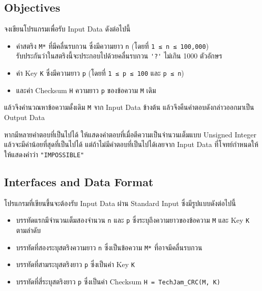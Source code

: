 \subsection{Objectives}

\noindent
จงเขียนโปรแกรมเพื่อรับ Input Data ดังต่อไปนี้
\begin{itemize}
    \item
        ค่าสตริง \lstinline{M*} ที่มีคลื่นรบกวน ซึ่งมีความยาว \lstinline{n} (โดยที่ \lstinline{1 ≤ n ≤ 100,000}) \\
        รับประกันว่าในสตริงนี้จะประกอบไปด้วยคลื่นรบกวน \lstinline{'?'} ไม่เกิน 1000 ตัวอักษร
    \item 
        ค่า Key \lstinline{K} ซึ่งมีความยาว \lstinline{p} (โดยที่ \lstinline{1 ≤ p ≤ 100} และ \lstinline{p ≤ n})
    \item 
        และค่า Checksum \lstinline{H} ความยาว \lstinline{p} ของข้อความ \lstinline{M} เดิม 
\end{itemize}

\noindent
แล้วจึงคำนวณหาข้อความดั้งเดิม \lstinline{M} จาก Input Data ข้างต้น แล้วจึงคืนคำตอบดังกล่าวออกมาเป็น Output Data

หากมีหลายคำตอบที่เป็นไปได้ ให้แสดงคำตอบที่เมื่อตีความเป็นจำนวนเต็มแบบ Unsigned Integer แล้วจะมีค่าน้อยที่สุดที่เป็นไปได้ \;
แต่ถ้าไม่มีคำตอบที่เป็นไปได้เลยจาก Input Data ที่โจทย์กำหนดให้ ให้แสดงคำว่า \lstinline{"IMPOSSIBLE"}


\subsection{Interfaces and Data Format}

\noindent
โปรแกรมที่เขียนขึ้นจะต้องรับ Input Data ผ่าน Standard Input ซึ่งมีรูปแบบดังต่อไปนี้

\begin{itemize}
    \item
        บรรทัดแรกมีจำนวนเต็มสองจำนวน \lstinline{n} และ \lstinline{p} ซึ่งระบุถึงความยาวของข้อความ \lstinline{M} และ Key \lstinline{K} ตามลำดับ
    \item 
        บรรทัดที่สองระบุสตริงความยาว \lstinline{n} ซึ่งเป็นข้อความ \lstinline{M*} ที่อาจมีคลื่นรบกวน
    \item 
        บรรทัดที่สามระบุสตริงยาว \lstinline{p} ซึ่งเป็นค่า Key \lstinline{K}
    \item
        บรรทัดที่สี่ระบุสตริงยาว \lstinline{p} ซึ่งเป็นค่า Checksum \lstinline{H = TechJam_CRC(M, K)}
\end{itemize}

